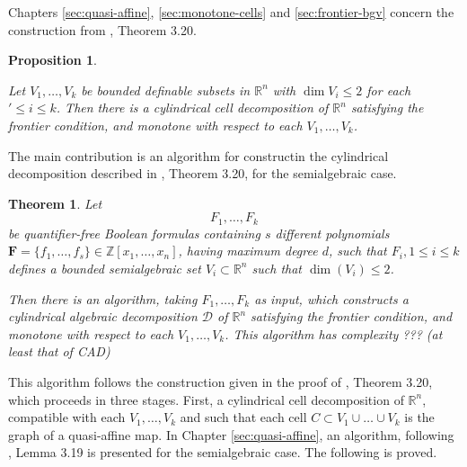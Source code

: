\documentclass[
]{book}
\newtheorem{theorem}{Theorem}[chapter]
\newtheorem{proposition}{Proposition}[chapter]
\theoremstyle{definition}
\theoremstyle{definition}
\theoremstyle{definition}
\theoremstyle{definition}
\theoremstyle{remark}
\begin{document}
Chapters \ref{sec:quasi-affine}, \ref{sec:monotone-cells} and \ref{sec:frontier-bgv} concern the construction from \citet{bgv15}, Theorem 3.20.

\begin{proposition}
\protect\hypertarget{prp:bgv-main}{}\label{prp:bgv-main}\citep[Theorem 3.20]{bgv15}

Let \(V_1, \ldots, V_k\) be bounded deﬁnable subsets in \(\mathbb{R}^n\) with \(\dim V_i \le 2\) for each \(' \le i \le k\).
Then there is a cylindrical cell decomposition of \(\mathbb{R}^n\) satisfying the frontier condition, and monotone with respect to each \(V_1, \ldots, V_k\).
\end{proposition}

The main contribution is an algorithm for constructin the cylindrical decomposition described in \citet{bgv15}, Theorem 3.20, for the semialgebraic case.

\begin{theorem}
\protect\hypertarget{thm:bgv-algorithm}{}\label{thm:bgv-algorithm}Let
\[
F_1,\ldots,F_k
\]
be quantifier-free Boolean formulas containing \(s\) different polynomials \(\mathbf{F} = \{ f_1,\ldots, f_s \} \in \mathbb{Z}[x_1,\ldots,x_n]\), having maximum degree \(d\), such that \(F_i, 1\le i \le k\) defines a bounded semialgebraic set \(V_i \subset \mathbb{R}^n\) such that \(\dim(V_i) \le 2\).

Then there is an algorithm, taking \(F_1,\ldots,F_k\) as input, which constructs a cylindrical algebraic decomposition \(\mathcal{D}\) of \(\mathbb{R}^n\) satisfying the frontier condition, and monotone with respect to each \(V_1, \ldots, V_k\).
This algorithm has complexity ???
(at least that of CAD)
\end{theorem}

This algorithm follows the construction given in the proof of \citet{bgv15}, Theorem 3.20, which proceeds in three stages.
First, a cylindrical cell decomposition of \(\mathbb{R}^n\), compatible with each \(V_1,\ldots,V_k\) and such that each cell \(C \subset V_1\cup\ldots\cup V_k\) is the graph of a quasi-affine map. In Chapter \ref{sec:quasi-affine}, an algorithm, following \citet{bgv15}, Lemma 3.19 is presented for the semialgebraic case. The following is proved.
\end{document}
